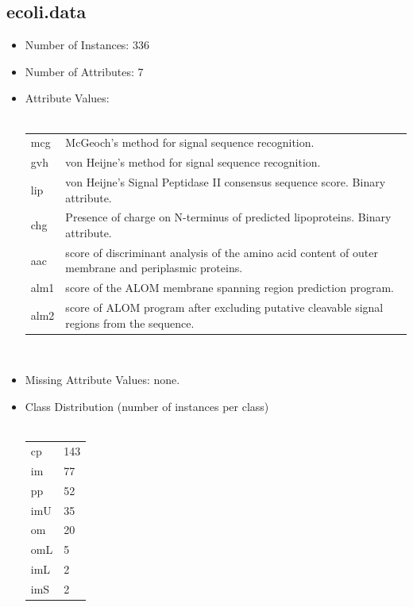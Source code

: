 \documentclass[10pt]{report}
\begin{document}
\subsection*{ecoli.data}
\begin{itemize}
\item Number of Instances:  336
\item Number of Attributes: 7 
\item Attribute Values:
  \\\\
  \begin{left}
    \begin{tabular}{ l p{10cm} }
      mcg  &   McGeoch's method for signal sequence recognition. \\
      gvh  &   von Heijne's method for signal sequence recognition. \\
      lip  &   von Heijne's Signal Peptidase II consensus sequence score. Binary attribute. \\
      chg  &   Presence of charge on N-terminus of predicted lipoproteins. Binary attribute. \\
      aac  &   score of discriminant analysis of the amino acid content of outer membrane and periplasmic proteins. \\
      alm1 &   score of the ALOM membrane spanning region prediction program. \\
      alm2 &   score of ALOM program after excluding putative cleavable signal regions from the sequence. \\
    \end{tabular}
  \end{left}
  \\   
\item Missing Attribute Values: none.
\item Class Distribution (number of instances per class)
  \\\\
  \begin{left}
    \begin{tabular}{ l l }
      cp    &      143 \\
      im    &       77 \\               
      pp    &       52 \\
      imU   &       35 \\
      om    &       20 \\
      omL   &        5 \\
      imL   &        2 \\
      imS   &        2 \\
    \end{tabular}
  \end{left}
\end{itemize}
\end{document}
